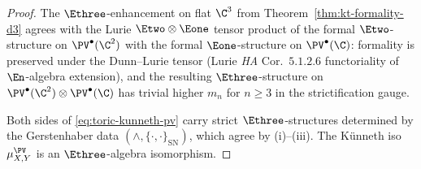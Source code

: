 \begin{proof}
The $\Ethree$-enhancement on flat $\C^3$ from Theorem~\ref{thm:kt-formality-d3} agrees with the Lurie $\Etwo \otimes \Eone$ tensor product of the formal $\Etwo$-structure on $\PV^\bullet(\C^2)$ with the formal $\Eone$-structure on $\PV^\bullet(\C)$: formality is preserved under the Dunn--Lurie tensor (Lurie \emph{HA} Cor.~$5.1.2.6$ functoriality of $\En$-algebra extension), and the resulting $\Ethree$-structure on $\PV^\bullet(\C^2) \otimes \PV^\bullet(\C)$ has trivial higher $m_n$ for $n \geq 3$ in the strictification gauge.

Both sides of \eqref{eq:toric-kunneth-pv} carry strict $\Ethree$-structures determined by the Gerstenhaber data $(\wedge, \{\cdot, \cdot\}_{\mathrm{SN}})$, which agree by (i)--(iii). The K\"unneth iso $\mu^{\PV}_{X,Y}$ is an $\Ethree$-algebra isomorphism.
\end{proof}

